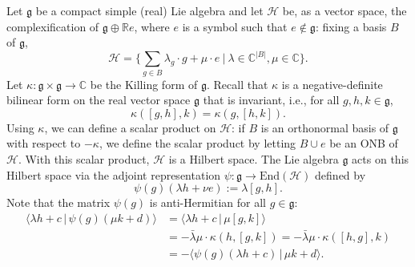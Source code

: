 \documentclass[a4paper]{article}
\newcommand{\End}{\mathrm{End}}
\theoremstyle{definition}
\begin{document}
Let $\mathfrak{g}$ be a compact simple (real) Lie algebra and let $\mathcal{H}$ be, as a vector space, the complexification of $\mathfrak{g} \oplus \mathbb{R}e$, where $e$ is a symbol such that $e \notin \mathfrak g$: fixing a basis $B$ of $\mathfrak{g}$,
\begin{equation*}
    \mathcal H = \bigg\{ \sum_{g\in B}\lambda_g \cdot g + \mu \cdot e \ | \ \lambda\in\mathbb{C}^{|B|}, \mu \in \mathbb{C} \bigg\}.
\end{equation*}
Let $\kappa\colon \mathfrak{g} \times \mathfrak{g} \to \mathbb{C}$ be the Killing form of $\mathfrak{g}$. Recall that $\kappa$ is a negative-definite bilinear form on the real vector space $\mathfrak{g}$ that is invariant, i.e., for all $g,h,k\in \mathfrak{g}$,
\begin{equation*}
    \kappa([g,h],k) = \kappa(g,[h,k]).
\end{equation*}
Using $\kappa$, we can define a scalar product on $\mathcal{H}$: if $B$ is an orthonormal basis of $\mathfrak{g}$ with respect to $-\kappa$, we define the scalar product by letting $B\cup e$ be an ONB of $\mathcal{H}$. With this scalar product, $\mathcal{H}$ is a Hilbert space.  The Lie algebra $\mathfrak{g}$ acts on this Hilbert space via the adjoint representation $\psi\colon \mathfrak{g}\to \End(\mathcal{H})$ defined by 
\begin{equation*}
    \psi(g)(\lambda h + \nu e) := \lambda [g,h].
\end{equation*}
Note that the matrix $\psi(g)$ is anti-Hermitian for all $g\in \mathfrak{g}$:
\begin{align*}
    \langle \lambda h + c\,|\, \psi(g) (\mu k + d) \rangle &= \langle \lambda h + c \,|\, \mu [g,k] \rangle \\
    &= - \bar \lambda \mu \cdot \kappa( h, [g,k]) = - \bar \lambda \mu \cdot \kappa( [h,g], k) \\
    &= - \langle\psi(g)(\lambda h +c)\,|\, \mu k + d \rangle .
\end{align*}
\end{document}
